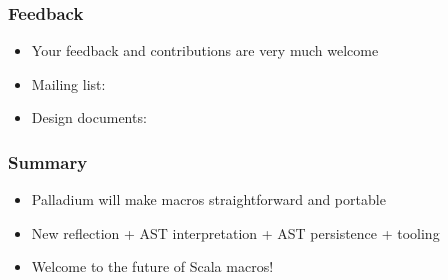 \documentclass[svgnames,dvipsnames,hyperref={bookmarks=false}]{beamer}
\begin{document}
\begin{frame}[fragile]
\frametitle{Feedback}

\begin{itemize}
\item Your feedback and contributions are very much welcome
\item Mailing list: 
\item Design documents: 
\end{itemize}
\end{frame}

\begin{frame}[fragile]
\frametitle{Summary}

\begin{itemize}
\item Palladium will make macros straightforward and portable
\item New reflection + AST interpretation + AST persistence + tooling
\item Welcome to the future of Scala macros!
\end{itemize}
\end{frame}
\end{document}
